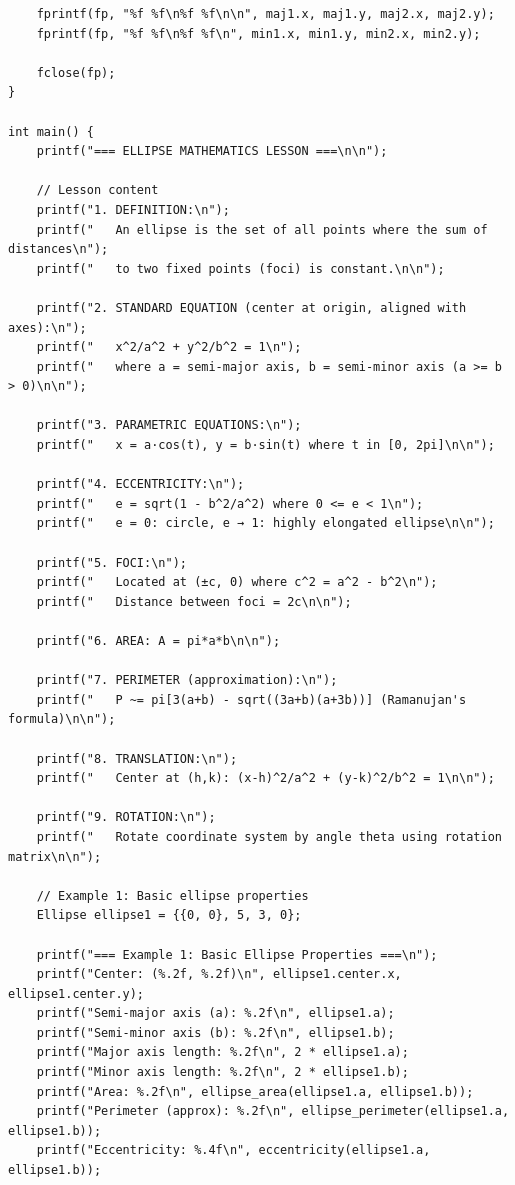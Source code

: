 \documentclass[a4paper,14pt]{article}
\begin{document}
{\begin{verbatim}
    fprintf(fp, "%f %f\n%f %f\n\n", maj1.x, maj1.y, maj2.x, maj2.y);
    fprintf(fp, "%f %f\n%f %f\n", min1.x, min1.y, min2.x, min2.y);

    fclose(fp);
}

int main() {
    printf("=== ELLIPSE MATHEMATICS LESSON ===\n\n");

    // Lesson content
    printf("1. DEFINITION:\n");
    printf("   An ellipse is the set of all points where the sum of distances\n");
    printf("   to two fixed points (foci) is constant.\n\n");

    printf("2. STANDARD EQUATION (center at origin, aligned with axes):\n");
    printf("   x^2/a^2 + y^2/b^2 = 1\n");
    printf("   where a = semi-major axis, b = semi-minor axis (a >= b > 0)\n\n");

    printf("3. PARAMETRIC EQUATIONS:\n");
    printf("   x = a·cos(t), y = b·sin(t) where t in [0, 2pi]\n\n");

    printf("4. ECCENTRICITY:\n");
    printf("   e = sqrt(1 - b^2/a^2) where 0 <= e < 1\n");
    printf("   e = 0: circle, e → 1: highly elongated ellipse\n\n");

    printf("5. FOCI:\n");
    printf("   Located at (±c, 0) where c^2 = a^2 - b^2\n");
    printf("   Distance between foci = 2c\n\n");

    printf("6. AREA: A = pi*a*b\n\n");

    printf("7. PERIMETER (approximation):\n");
    printf("   P ~= pi[3(a+b) - sqrt((3a+b)(a+3b))] (Ramanujan's formula)\n\n");

    printf("8. TRANSLATION:\n");
    printf("   Center at (h,k): (x-h)^2/a^2 + (y-k)^2/b^2 = 1\n\n");

    printf("9. ROTATION:\n");
    printf("   Rotate coordinate system by angle theta using rotation matrix\n\n");

    // Example 1: Basic ellipse properties
    Ellipse ellipse1 = {{0, 0}, 5, 3, 0};

    printf("=== Example 1: Basic Ellipse Properties ===\n");
    printf("Center: (%.2f, %.2f)\n", ellipse1.center.x, ellipse1.center.y);
    printf("Semi-major axis (a): %.2f\n", ellipse1.a);
    printf("Semi-minor axis (b): %.2f\n", ellipse1.b);
    printf("Major axis length: %.2f\n", 2 * ellipse1.a);
    printf("Minor axis length: %.2f\n", 2 * ellipse1.b);
    printf("Area: %.2f\n", ellipse_area(ellipse1.a, ellipse1.b));
    printf("Perimeter (approx): %.2f\n", ellipse_perimeter(ellipse1.a, ellipse1.b));
    printf("Eccentricity: %.4f\n", eccentricity(ellipse1.a, ellipse1.b));


\end{verbatim}}
\end{document}
